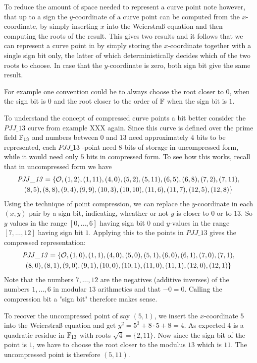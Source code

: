 To reduce the amount of space needed to represent a curve point note however, that up to a sign the $y$-coordinate of a curve point can be computed from the $x$-coordinate, by simply inserting $x$ into the Weierstraß equation and then computing the roots of the result. This gives two results and it follows that we can represent a curve point in  by simply storing the $x$-coordinate together with a single sign bit only, the latter of which deterministically decides which of the two roots to choose. In case that the $y$-coordinate is zero, both sign bit give the same result.

For example one convention could be to always choose the root closer to $0$, when the sign bit is $0$ and the root closer to the order of $\mathbb{F}$ when the sign bit is $1$.

\begin{example} To understand the concept of compressed curve points a bit better consider the $\mathit{PJJ\_13}$ curve from example XXX again. Since this curve is defined over the prime field $\mathbb{F}_{13}$ and numbers between $0$ and $13$ need approximately $4$ bits to be represented, each $\mathit{PJJ\_13}$ -point need $8$-bits of storage in uncompressed form, while it would need only $5$ bits in compressed form. To see how this works, recall that in uncompressed form we have
\begin{multline*}
\mathit{PJJ\_13} = \{\mathcal{O}, (1, 2), (1, 11), (4, 0), (5, 2), (5, 11), (6, 5), (6, 8), (7,2), (7, 11), \\ (8, 5), (8, 8), (9, 4), (9, 9), (10, 3), (10,
10), (11, 6), (11, 7), (12, 5), (12, 8)\}
\end{multline*}
Using the technique of point compression, we can replace the $y$-coordinate in each $(x,y)$ pair by a sign bit, indicating, wheather or not $y$ is closer to $0$ or to $13$. So $y$ values in the range $[0,\ldots,6]$ having sign bit $0$ and $y$-values in the range $[7,\ldots,12]$ having sign bit $1$. Applying this to the points in $\mathit{PJJ\_13}$ gives the compressed representation:
\begin{multline*}
\mathit{PJJ\_13} = \{\mathcal{O}, (1, 0), (1, 1), (4, 0), (5, 0), (5, 1), (6, 0), (6, 1), (7,0), (7, 1), \\ (8, 0), (8, 1), (9, 0), (9, 1), (10, 0), (10,1), (11, 0), (11, 1), (12, 0), (12, 1)\}
\end{multline*} 
Note that the numbers $7,\ldots, 12$ are the negatives (additive inverses) of the numbers $1,\ldots, 6$ in modular $13$ arithmetics and that $-0=0$. Calling the compression bit a "sign bit" therefore makes sense.

To recover the uncompressed point of say $(5,1)$, we insert the $x$-coordinate $5$ into the Weierstraß equation and get $y^2 = 5^3 + 8\cdot 5 +8 = 4$. As expected $4$ is a quadratic residue in $\mathbb{F}_{13}$ with roots $\sqrt{4}= \{2,11\}$. Now since the sign bit of the point is $1$, we have to choose the root closer to the modulus $13$ which is $11$. The uncompressed point is therefore $(5,11)$. 
\end{example}

